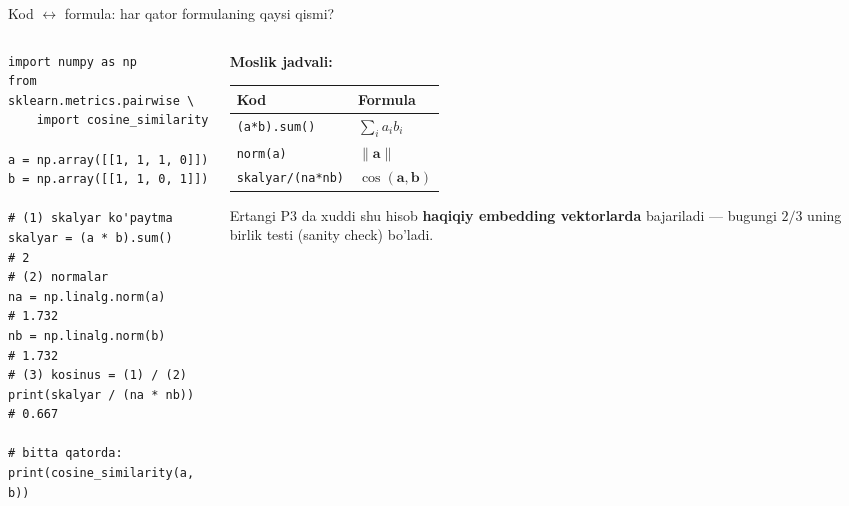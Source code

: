 \documentclass[aspectratio=169,11pt]{beamer}
\begin{document}
\begin{frame}[fragile]{Kod $\leftrightarrow$ formula: har qator formulaning qaysi qismi?}
  \begin{columns}[T]
    \begin{column}{0.52\textwidth}
      \begin{lstlisting}
import numpy as np
from sklearn.metrics.pairwise \
    import cosine_similarity

a = np.array([[1, 1, 1, 0]])
b = np.array([[1, 1, 0, 1]])

# (1) skalyar ko'paytma
skalyar = (a * b).sum()      # 2
# (2) normalar
na = np.linalg.norm(a)       # 1.732
nb = np.linalg.norm(b)       # 1.732
# (3) kosinus = (1) / (2)
print(skalyar / (na * nb))   # 0.667

# bitta qatorda:
print(cosine_similarity(a, b))
      \end{lstlisting}
    \end{column}
    \begin{column}{0.44\textwidth}
      \textbf{Moslik jadvali:}
      \vspace{0.2em}
      \begin{center}\scriptsize
      \begin{tabular}{ll}
        \toprule
        \textbf{Kod} & \textbf{Formula} \\
        \midrule
        \texttt{(a*b).sum()} & $\sum_i a_i b_i$ \\
        \texttt{norm(a)} & $\lVert\mathbf{a}\rVert$ \\
        \texttt{skalyar/(na*nb)} & $\cos(\mathbf{a},\mathbf{b})$ \\
        \bottomrule
      \end{tabular}
      \end{center}
      \vspace{0.3em}
      \begin{tcolorbox}[okbox,top=2pt,bottom=2pt]
        \small Ertangi P3 da xuddi shu hisob \textbf{haqiqiy
        embedding vektorlarda} bajariladi --- bugungi $2/3$ uning
        birlik testi (sanity check) bo'ladi.
      \end{tcolorbox}
    \end{column}
  \end{columns}
\end{frame}
\end{document}
